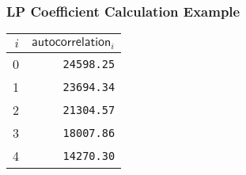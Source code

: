 \begin{landscape}

\subsubsection{LP Coefficient Calculation Example}
\begin{table}[h]
{
\begin{tabular}{r|r}
$i$ & $\textsf{autocorrelation}_i$ \\
\hline
0 & \texttt{24598.25} \\
1 & \texttt{23694.34} \\
2 & \texttt{21304.57} \\
3 & \texttt{18007.86} \\
4 & \texttt{14270.30} \\
\end{tabular}
}
\end{table}


\end{landscape}
